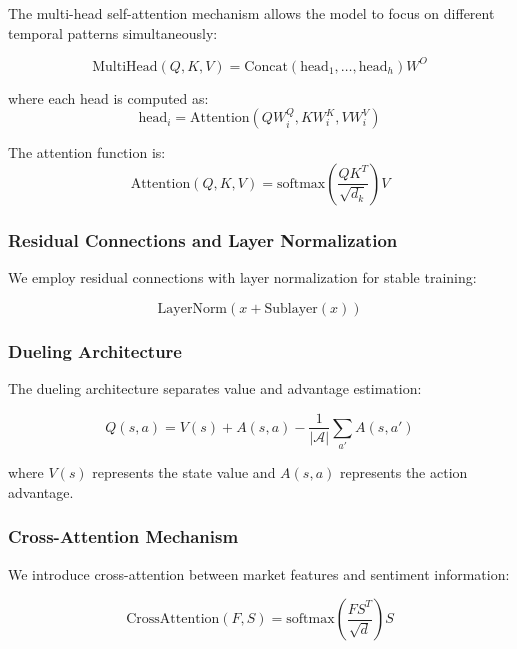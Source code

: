 \documentclass[11pt,twocolumn]{article}
\newcommand{\softmax}{\text{softmax}}
\theoremstyle{definition}
\begin{document}
The multi-head self-attention mechanism allows the model to focus on different temporal patterns simultaneously:

\begin{equation}
\text{MultiHead}(Q, K, V) = \text{Concat}(\text{head}_1, \ldots, \text{head}_h)W^O
\end{equation}

where each head is computed as:
\begin{equation}
\text{head}_i = \text{Attention}(QW_i^Q, KW_i^K, VW_i^V)
\end{equation}

The attention function is:
\begin{equation}
\text{Attention}(Q, K, V) = \softmax\left(\frac{QK^T}{\sqrt{d_k}}\right)V
\end{equation}

\subsubsection{Residual Connections and Layer Normalization}

We employ residual connections with layer normalization for stable training:

\begin{equation}
\text{LayerNorm}(x + \text{Sublayer}(x))
\end{equation}

\subsubsection{Dueling Architecture}

The dueling architecture separates value and advantage estimation:

\begin{equation}
Q(s,a) = V(s) + A(s,a) - \frac{1}{|\mathcal{A}|}\sum_{a'}A(s,a')
\end{equation}

where $V(s)$ represents the state value and $A(s,a)$ represents the action advantage.

\subsubsection{Cross-Attention Mechanism}

We introduce cross-attention between market features and sentiment information:

\begin{equation}
\text{CrossAttention}(F, S) = \softmax\left(\frac{FS^T}{\sqrt{d}}\right)S
\end{equation}
\end{document}
